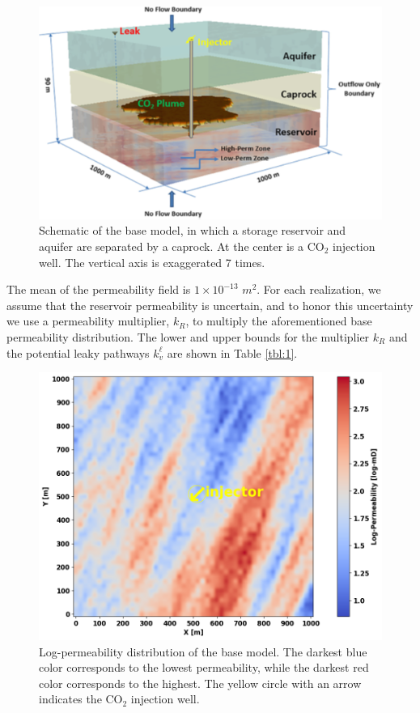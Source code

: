 \documentclass[10pt, twoside]{article}
\begin{document}
\begin{figure} [H]
\centering
\includegraphics[width=10 cm]{Figure 5.png}
\caption{Schematic of the base model, in which a storage reservoir and aquifer are separated by a caprock. At the center is a CO$_2$ injection well. The vertical axis is exaggerated 7 times.}
\label{model}
\end{figure}

The mean of the permeability field is $1\times10^{-13}$ $m^2$. For each realization, we assume that the reservoir permeability is uncertain, and to honor this uncertainty we use a permeability multiplier, $k_R$, to multiply the aforementioned base permeability distribution. The lower and upper bounds for the multiplier $k_R$ and the potential leaky pathways $k_v^\ell$ are shown in Table \ref{tbl:1}. 

\begin{figure} [H]
\centering
\includegraphics[width=10 cm]{Figure 6.png}
\caption{Log-permeability distribution of the base model. The darkest blue color corresponds to the lowest permeability, while the darkest red color corresponds to the highest. The yellow circle with an arrow indicates the CO$_2$ injection well.}
\label{perm_hete}
\end{figure}
\end{document}
